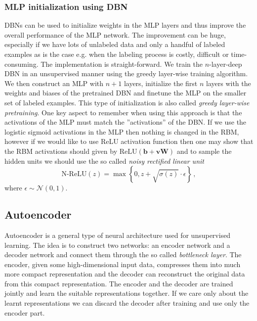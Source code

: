 \documentclass[a5paper]{article}
\newcommand{\mc}[1]{\mathcal{#1}}
\begin{document}
\subsubsection{MLP initialization using DBN}

DBNs can be used to initialize weights in the MLP layers and thus improve the overall performance of
the MLP network. The improvement can be huge, especially if we have lots of unlabeled data and only
a handful of labeled examples as is the case e.g. when the labeling process is costly, difficult or
time-consuming. The implementation is straight-forward. We train the $n$-layer-deep DBN in an
unsupervised manner using the greedy layer-wise training algorithm. We then construct an MLP with
$n+1$ layers, initialize the first $n$ layers with the weights and biases of the pretrained DBN and
finetune the MLP on the smaller set of labeled examples. This type of initialization is also called
\emph{greedy layer-wise pretraining}. One key aspect to remember when using this approach is that
the activations of the MLP must match the ''activations'' of the DBN. If we use the logistic sigmoid
activations in the MLP then nothing is changed in the RBM, however if we would like to use ReLU
activation function then one may show that the RBM activations should given by $\text{ReLU}(\bm{b} +
\bm{vW})$ and to sample the hidden units we should use the so called \emph{noisy rectified linear
unit} 
\[
   \text{N-ReLU}(z) = \max\left\{ 0, z + \sqrt{\sigma(z)} \cdot \epsilon \right\}\,,
\]
where $\epsilon \sim \mc{N}(0,1)$.


\subsection{Autoencoder}

Autoencoder is a general type of neural architecture used for unsupervised learning. The idea is to
construct two networks: an encoder network and a decoder network and connect them through the so
called \emph{bottleneck layer}. The encoder, given some high-dimensional input data, compresses them
into much more compact representation and the decoder can reconstruct the original data from this
compact representation. The encoder and the decoder are trained jointly and learn the suitable
representations together. If we care only about the learnt representations we can discard the
decoder after training and use only the encoder part.
\end{document}
